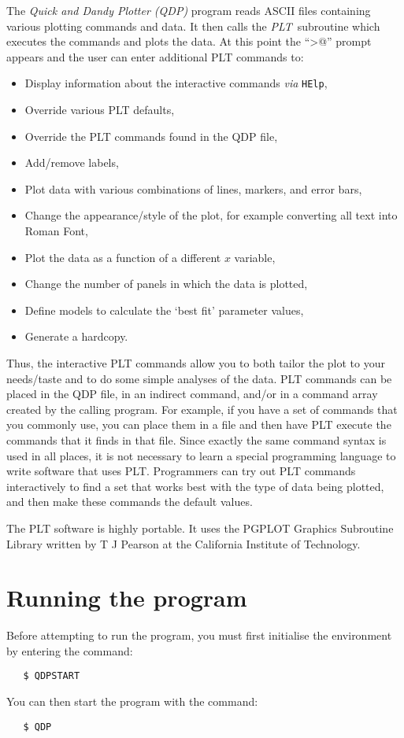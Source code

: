 The {\em Quick and Dandy Plotter (QDP)} program reads ASCII files containing
various plotting commands and data.
It then calls the {\em PLT}\ subroutine which executes the commands
and plots the data.
At this point the ``\verb@PLT>@'' prompt appears and the user can enter
additional PLT commands to:
\begin{itemize}
\item Display information about the interactive commands
{\em via} {\tt HElp},

\item Override various PLT defaults,

\item Override the PLT commands found in the QDP file,

\item Add/remove labels,

\item Plot data with various combinations of lines, markers, and error bars,

\item Change the appearance/style of the plot, for example converting
all text into Roman Font,

\item Plot the data as a function of a different $x$ variable,

\item Change the number of panels in which the data is plotted,

\item Define models to calculate the `best fit' parameter values,

\item Generate a hardcopy.
\end{itemize}

Thus, the interactive PLT commands allow you to both tailor the plot to your
needs/taste and to do some simple analyses of the data.
PLT commands can be placed in the QDP file, in an indirect command, and/or in
a command array created by the calling program.
For example, if you have a set of commands that you commonly use, you can
place them in a file and then have PLT execute the commands that it finds in
that file.
Since exactly the same command syntax is used in all places, it is not
necessary to learn a special programming language to write software that uses
PLT.
Programmers can try out PLT commands interactively to find a set that works
best with the type of data being plotted, and then make these commands the
default values.

The PLT software is highly portable.
It uses the PGPLOT Graphics Subroutine Library written by T J Pearson at the
California Institute of Technology.

\section{Running the program}

Before attempting to run the program, you must first initialise the
environment by entering the command:
\begin{verbatim}
   $ QDPSTART
\end{verbatim}
You can then start the program with the command:
\begin{verbatim}
   $ QDP
\end{verbatim}


